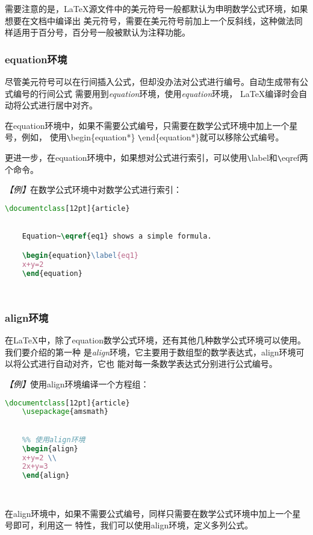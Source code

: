需要注意的是，LaTeX源文件中的美元符号一般都默认为申明数学公式环境，如果想要在文档中编译出
美元符号，需要在美元符号前加上一个反斜线，这种做法同样适用于百分号，百分号一般被默认为注释功能。

\subsubsection{equation环境}
尽管美元符号可以在行间插入公式，但却没办法对公式进行编号。自动生成带有公式编号的行间公式
需要用到\emph{equation}环境，使用\emph{equation}环境， LaTeX编译时会自动将公式进行居中对齐。

在equation环境中，如果不需要公式编号，只需要在数学公式环境中加上一个星号，例如，
使用\verb|\|begin\{equation*\} \verb|\|end\{equation*\}就可以移除公式编号。

更进一步，在equation环境中，如果想对公式进行索引，可以使用\verb|\|label和\verb|\|eqref两个命令。

\emph{【例】}在数学公式环境中对数学公式进行索引：
\begin{lstlisting}[language=TeX]
    \documentclass[12pt]{article}
    

    Equation~\eqref{eq1} shows a simple formula.

    \begin{equation}\label{eq1}
    x+y=2
    \end{equation}

    
\end{lstlisting}

\subsubsection{align环境}
在LaTeX中，除了equation数学公式环境，还有其他几种数学公式环境可以使用。我们要介绍的第一种
是\emph{align}环境，它主要用于数组型的数学表达式，align环境可以将公式进行自动对齐，它也
能对每一条数学表达式分别进行公式编号。

\emph{【例】}使用align环境编译一个方程组：
\begin{lstlisting}[language=TeX]
    \documentclass[12pt]{article}
    \usepackage{amsmath}
    

    %% 使用align环境
    \begin{align}
    x+y=2 \\
    2x+y=3
    \end{align}

    
\end{lstlisting}

在align环境中，如果不需要公式编号，同样只需要在数学公式环境中加上一个星号即可，利用这一
特性，我们可以使用align环境，定义多列公式。

